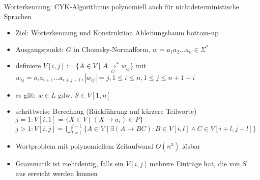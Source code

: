 
\begin{frame}{Worterkennung: CYK-Algorithmus}
	polynomiell auch für nichtdeterministische Sprachen
	\begin{itemize}
		\item Ziel: Worterkennung und Konstruktion Ableitungsbaum bottom-up
		\item Ausgangspunkt: $G$ in Chomsky-Normalform, $w=a_1a_2 \ldots a_n \in \Sigma^*$
		\item definiere $V[i,j]:=\{A \in V \mid A \underset{G}{\Rightarrow}^* w_{ij} \}$ mit\\
		$w_{ij}=a_ia_{i+1}\ldots a_{i+j-1}, |w_{ij}|=j, 1\leq i \leq n, 1\leq j \leq n+1-i$
		\item es gilt: $w\in L$ gdw. $S \in V[1,n]$
		\item schrittweise Berechnug (Rückführung auf kürzere Teilworte)\\
		$j=1: V[i,1]=\{X \in V \mid (X\rightarrow a_i) \in P\}$\\
		$j>1: V[i,j]=\bigcup_{l=1}^{j-1}\{A\in V\mid \exists (A\rightarrow BC): B \in V[i,l] \land C \in V[i+l, j-l] \}$
		\item Wortproblem mit polynomiellem Zeitaufwand $O(n^3)$ lösbar
		\item Grammatik ist mehrdeutig, falls ein $V[i,j]$ mehrere Einträge hat, die von $S$ aus erreicht werden können
	\end{itemize}
\end{frame}

